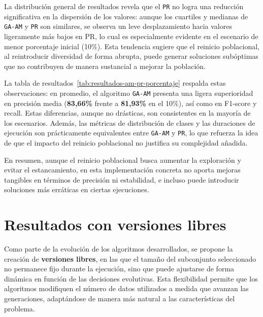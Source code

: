 La distribución general de resultados revela que el \texttt{PR} no logra una reducción significativa en la dispersión de los valores:
aunque los cuartiles y medianas de \texttt{GA-AM} y \texttt{PR} son similares, se observa un leve desplazamiento hacia valores ligeramente más bajos en PR,
lo cual es especialmente evidente en el escenario de menor porcentaje inicial (10\%).
Esta tendencia sugiere que el reinicio poblacional, al reintroducir diversidad de forma abrupta,
puede generar soluciones subóptimas que no contribuyen de manera sustancial a mejorar la población.

La tabla de resultados~\ref{tab:resultados-am-pr-porcentaje} respalda estas observaciones: en promedio,
el algoritmo \texttt{GA-AM} presenta una ligera superioridad en precisión media (\textbf{83,66\%} frente a \textbf{81,93\%} en el 10\%), así como en F1-score y recall.
Estas diferencias, aunque no drásticas, son consistentes en la mayoría de los escenarios.
Además, las métricas de distribución de clases y las duraciones de ejecución son prácticamente equivalentes entre \texttt{GA-AM} y \texttt{PR},
lo que refuerza la idea de que el impacto del reinicio poblacional no justifica su complejidad añadida.

En resumen, aunque el reinicio poblacional busca aumentar la exploración y evitar el estancamiento,
en esta implementación concreta no aporta mejoras tangibles en términos de precisión ni estabilidad,
e incluso puede introducir soluciones más erráticas en ciertas ejecuciones.

\section{Resultados con versiones libres}\label{sec:resultados-versiones-libres}
Como parte de la evolución de los algoritmos desarrollados, se propone la creación de \textbf{versiones libres},
en las que el tamaño del subconjunto seleccionado no permanece fijo durante la ejecución, sino que puede ajustarse de forma dinámica en función de las decisiones evolutivas.
Esta flexibilidad permite que los algoritmos modifiquen el número de datos utilizados a medida que avanzan las generaciones,
adaptándose de manera más natural a las características del problema.

